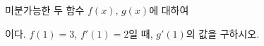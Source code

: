 미분가능한 두 함수 $f(x)$, $g(x)$에 대하여 \par\smallskip{}\par\smallskip\noindent 이다. $f(1)=3$, $f'(1)=2$일 때, $g'(1)$의 값을 구하시오.
